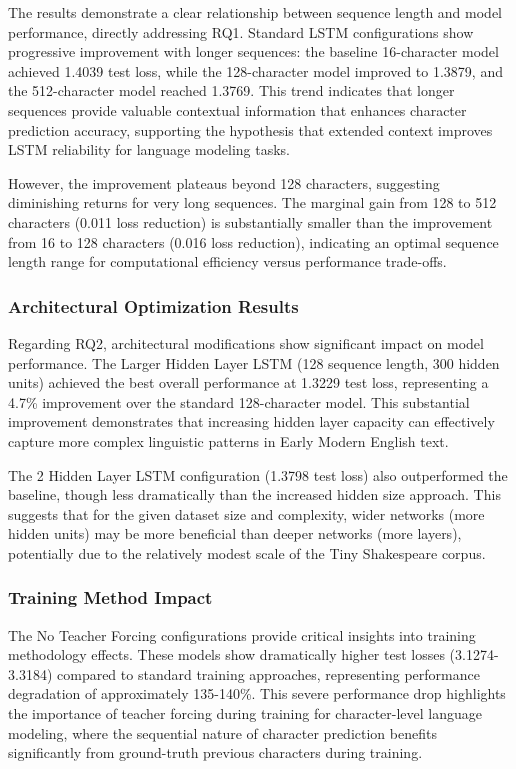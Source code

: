 \documentclass[12pt]{article}
\begin{document}
The results demonstrate a clear relationship between sequence length and model performance, directly addressing RQ1. Standard LSTM configurations show progressive improvement with longer sequences: the baseline 16-character model achieved 1.4039 test loss, while the 128-character model improved to 1.3879, and the 512-character model reached 1.3769. This trend indicates that longer sequences provide valuable contextual information that enhances character prediction accuracy, supporting the hypothesis that extended context improves LSTM reliability for language modeling tasks.

However, the improvement plateaus beyond 128 characters, suggesting diminishing returns for very long sequences. The marginal gain from 128 to 512 characters (0.011 loss reduction) is substantially smaller than the improvement from 16 to 128 characters (0.016 loss reduction), indicating an optimal sequence length range for computational efficiency versus performance trade-offs.

\subsubsection{Architectural Optimization Results}

Regarding RQ2, architectural modifications show significant impact on model performance. The Larger Hidden Layer LSTM (128 sequence length, 300 hidden units) achieved the best overall performance at 1.3229 test loss, representing a 4.7\% improvement over the standard 128-character model. This substantial improvement demonstrates that increasing hidden layer capacity can effectively capture more complex linguistic patterns in Early Modern English text.

The 2 Hidden Layer LSTM configuration (1.3798 test loss) also outperformed the baseline, though less dramatically than the increased hidden size approach. This suggests that for the given dataset size and complexity, wider networks (more hidden units) may be more beneficial than deeper networks (more layers), potentially due to the relatively modest scale of the Tiny Shakespeare corpus.

\subsubsection{Training Method Impact}

The No Teacher Forcing configurations provide critical insights into training methodology effects. These models show dramatically higher test losses (3.1274-3.3184) compared to standard training approaches, representing performance degradation of approximately 135-140\%. This severe performance drop highlights the importance of teacher forcing during training for character-level language modeling, where the sequential nature of character prediction benefits significantly from ground-truth previous characters during training.
\end{document}
